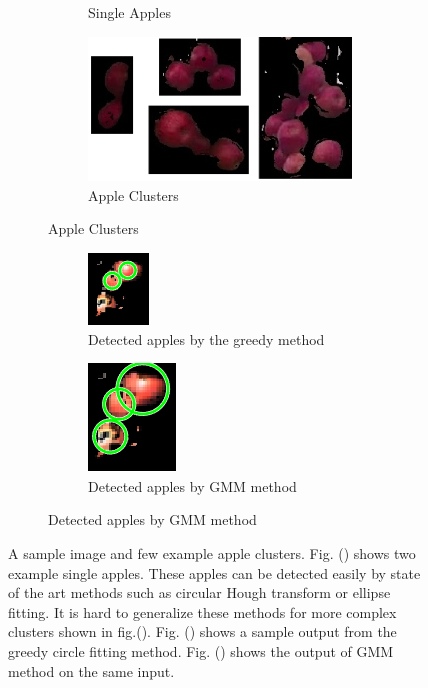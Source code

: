 \begin{figure}[tbp]
\begin{subfigure}[b]{.3\textwidth}
\begin{subfigure}[b]{\textwidth}
         \caption{Single Apples}
         \label{fig:sapple1}
         \end{subfigure}
         \begin{subfigure}[b]{\textwidth}
            \includegraphics[width = \textwidth]{figures/counting/capple1}           
         \caption{Apple Clusters}
         \label{fig:capple1}
         \end{subfigure}
       \end{subfigure} \quad \begin{subfigure}[b]{.3\textwidth}
              
       \begin{subfigure}[b]{\textwidth}
       \centering
            \includegraphics[scale = .8]{figures/counting/simplegreedy1}
         \caption{Detected apples by the greedy method}
         \label{fig:greedy}
       \end{subfigure}
       \begin{subfigure}[b]{\textwidth}
       \centering
            \includegraphics[scale = .5]{figures/counting/gmmcomp}
         \caption{Detected apples by GMM method}
         \label{fig:gmcomp}
       \end{subfigure}
       \end{subfigure} 
   \caption[Fruit counting in apple orchards.]{A sample image and few example apple clusters. Fig. () shows two example single apples. These apples can be detected easily by state of the art methods such as circular Hough transform or ellipse fitting. It is hard to generalize these methods for more complex clusters shown in fig.(). Fig. () shows a sample output from the greedy circle fitting method. Fig. () shows the output of GMM method on the same input.}
   \label{fig:groupex}
\end{figure}    


